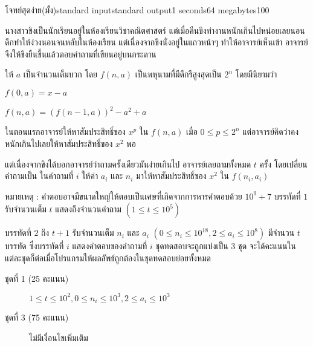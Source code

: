 \documentclass[11pt,a4paper]{article}
\begin{document}
\begin{problem}{โจทย์สุดง่าย(มั้ง)}{standard input}{standard output}{1 seconds}{64 megabytes}{100}

นางสาวขิงเป็นนักเรียนอยู่ในห้องเรียนวิชาคณิตศาสตร์ แต่เมื่อคืนขิงทำงานหนักเกินไปหน่อยเลยนอนดึกทำให้ง่วงนอนจนหลับในห้องเรียน แต่เนื่องจากขิงนั่งอยู่ในแถวหน้าๆ ทำให้อาจารย์เห็นเข้า อาจารย์จึงให้ขิงยืนขึ้นแล้วตอบคำถามที่เขียนอยู่บนกระดาน

ให้ $a$ เป็นจำนวนเต็มบวก โดย $f(n , a)$ เป็นพหุนามที่มีดีกรีสูงสุดเป็น $2^{n}$ โดยมีนิยามว่า 
\begin{center}

$f(0 , a) = x - a$ 

$f(n , a) = (f(n-1 , a))^2 - a^2 + a$  

\end{center}

ในตอนแรกอาจารย์ให้หาสัมประสิทธิ์ของ $x^p$ ใน $f(n , a)$ เมื่อ $0 \leq p \leq 2^n$ แต่อาจารย์คิดว่าคงหนักเกินไปเลยให้หาสัมประสิทธิ์ของ $x^2$ พอ

แต่เนื่องจากขิงได้บอกอาจารย์ว่าถามครั้งเดียวมันง่ายเกินไป อาจารย์เลยถามทั้งหมด $t$ ครั้ง โดยเปลี่ยนคำถามเป็น
ในคำถามที่ $i$ ให้ค่า $a_i$ และ $n_i$ มาให้หาสัมประสิทธิ์ของ $x^2$ ใน $f(n_i , a_i)$ 

หมายเหตุ : คำตอบอาจมีขนาดใหญ่ให้ตอบเป็นเศษที่เกิดจากการหารคำตอบด้วย $10^9 + 7$
\InputFile
บรรทัดที่ $1$ รับจำนวนเต็ม $t$ แสดงถึงจำนวนคำถาม $(1 \leq t \leq 10^5)$

บรรทัดที่ $2$ ถึง $t + 1$ รับจำนวนเต็ม $n_i$ และ $a_i$ $(0 \leq n_i \leq10^{18} , 2 \leq a_i \leq 10^8)$
\OutputFile
มีจำนวน $t$ บรรทัด ซึ่งบรรทัดที่ $i$ แสดงคำตอบของคำถามที่ $i$ 
\Scoring
ชุดทดสอบจะถูกแบ่งเป็น 3 ชุด จะได้คะแนนในแต่ละชุดก็ต่อเมื่อโปรแกรมให้ผลลัพธ์ถูกต้องในชุดทดสอบย่อยทั้งหมด

\begin{description}

\item[ชุดที่ 1 (25 คะแนน)]  $1 \leq t \leq 10^2 , 0 \leq n_i \leq 10^3 , 2 \leq a_i \leq 10^3$ 

\item[ชุดที่ 3 (75 คะแนน)] ไม่มีเงื่อนไขเพิ่มเติม

\end{description}

\Examples

\begin{example}
%
%
\end{example}

\end{problem}
\end{document}
